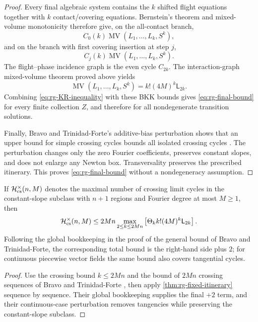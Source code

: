 \begin{proof}
Every final algebraic system contains the $k$ shifted flight equations together
with $k$ contact/covering equations.  Bernstein's theorem and mixed-volume
monotonicity therefore give, on the all-contact branch,
\[
 C_0(k)\operatorname{MV}(L_1,\ldots,L_k,S^k),
\]
and on the branch with first covering insertion at step $j$,
\[
 C_j(k)\operatorname{MV}(L_1,\ldots,L_k,S^k).
\]
The flight--phase incidence graph is the even cycle $C_{2k}$.  The
interaction-graph mixed-volume theorem proved above yields
\begin{equation}\label{eq:rg-cycle-MV}
 \operatorname{MV}(L_1,\ldots,L_k,S^k)
 =k!(4M)^k\mathsf L_{2k}.
\end{equation}
Combining \eqref{eq:rg-KR-inequality} with these BKK bounds gives
\eqref{eq:rg-final-bound} for every finite collection $Z$, and therefore for
all nondegenerate transition solutions.

Finally, Bravo and Trinidad-Forte's additive-bias perturbation shows that an
upper bound for simple crossing cycles bounds all isolated crossing cycles \cite[Proposition~17]{BravoTrinidadForte2026}.
The perturbation changes only the zero Fourier coefficients, preserves
constant slopes, and does not enlarge any Newton box.  Transversality preserves
the prescribed itinerary.  This proves \eqref{eq:rg-final-bound} without a
nondegeneracy assumption.
\end{proof}

\begin{corollary}
\label{cor:rg-global}
If $\mathcal H_{\rm cs}^{\times}(n,M)$ denotes the maximal number of crossing
limit cycles in the constant-slope subclass with $n+1$ regions and Fourier
degree at most $M\ge1$, then
\begin{equation}\label{eq:rg-global}
 \mathcal H_{\rm cs}^{\times}(n,M)
 \le2Mn\max_{2\le k\le2Mn}
 \left[\Theta_k k!(4M)^k\mathsf L_{2k}\right].
\end{equation}
Following the global bookkeeping in the proof of the general bound of Bravo and Trinidad-Forte, the corresponding total bound is the right-hand side plus $2$; for continuous piecewise vector fields the same bound also covers tangential cycles.
\end{corollary}

\begin{proof}
Use the crossing bound $k\le2Mn$ and the bound of $2Mn$ crossing sequences of
Bravo and Trinidad-Forte \cite[Propositions~12 and~15]{BravoTrinidadForte2026}, then apply \cref{thm:rg-fixed-itinerary} sequence by
sequence.  Their global bookkeeping supplies the final $+2$ term, and their continuous-case perturbation \cite[Proposition~19]{BravoTrinidadForte2026} removes tangencies while preserving the constant-slope subclass.
\end{proof}

